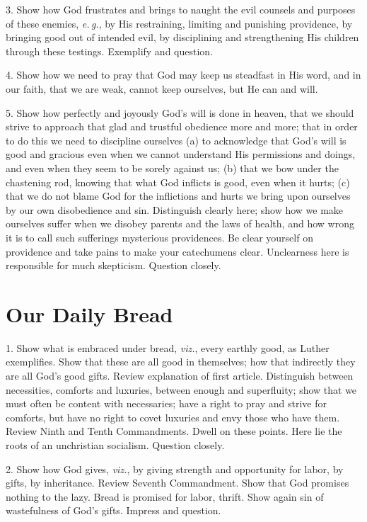 3. Show how God frustrates and brings to naught the evil counsels and purposes of these enemies, \emph{e.\,g.},  by His restraining, limiting and punishing providence, by bringing good out of intended evil, by disciplining and strengthening His children through these testings. Exemplify and question.

4. Show how we need to pray that God may keep us steadfast in His word, and in our faith, that we are weak, cannot keep ourselves, but He can and will.

5. Show how perfectly and joyously God’s will is done in heaven, that we should strive to approach that glad and trustful obedience more and more;  that in order to do this we need to discipline ourselves (a) to acknowledge that God’s will is good and gracious even when we cannot understand His permissions and doings, and even when they seem to be sorely against us; (b) that we bow under the chastening rod, knowing that what God inflicts is good, even when it hurts; (c) that we do not blame God for the inflictions and hurts we bring upon ourselves by our own disobedience and sin. Distinguish clearly here; show how we make ourselves suffer when we disobey parents and the laws of health, and how wrong it is to call such sufferings mysterious providences. Be clear yourself on providence
and take pains to make your catechumens clear. Unclearness here is responsible for much skepticism. Question closely.

\section{Our Daily Bread}

1. Show what is embraced under bread, \emph{viz.}, every earthly good, as Luther exemplifies. Show that these are all good in themselves; how that indirectly they are all God’s good gifts.  Review explanation of first article. Distinguish between necessities, comforts and luxuries, between enough and superfluity; show that we must often be content with necessaries; have a right to pray and strive for comforts, but have no right to covet luxuries and envy those who have them. Review Ninth and Tenth Commandments. Dwell on these points. Here lie the roots of an unchristian socialism. Question closely.

2. Show how God gives, \emph{viz.}, by giving strength and opportunity for labor, by gifts, by inheritance. Review Seventh Commandment. Show that God promises nothing to the lazy. Bread is promised for labor, thrift.  Show again sin of wastefulness of God’s gifts. Impress and question.

